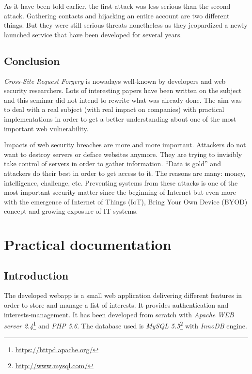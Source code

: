 \documentclass[a4paper,11pt,openany]{report}
\newcommand{\csrf}{\textit{Cross-Site Request Forgery}}
\begin{document}
  As it have been told earlier, the first attack was less serious than the second attack. Gathering contacts and 
  hijacking an entire account are two different things. But they were still serious threats nonetheless as they
  jeopardized a newly launched service that have been developed for several years. 
  
  \section{Conclusion}
  \csrf{} is nowadays well-known by developers and web security researchers. Lots of interesting papers have been written 
  on the subject and this seminar did not intend to rewrite what was already done. The aim was to deal with a real subject 
  (with real impact on companies) with practical implementations in order to get a better understanding about one of the 
  most important web vulnerability.
  
  Impacts of web security breaches are more and more important. Attackers do not want to destroy servers or deface 
  websites anymore. They are trying to invisibly take control of servers in order to gather information. ``Data is gold'' 
  and attackers do their best in order to get access to it. The reasons are many: money, intelligence, challenge, etc. 
  Preventing systems from these attacks is one of the most important security matter since the beginning of Internet but 
  even more with the emergence of Internet of Things (IoT), Bring Your Own Device (BYOD) concept and growing exposure of 
  IT systems.
  
\appendix
{}

\chapter{Practical documentation} \label{app:practical_documentation}

\section{Introduction}
The developed webapp is a small web application delivering different features 
in order to store and manage a list of interests. It provides authentication and 
interests-management. It has been developed from scratch with \textit{Apache 
WEB server 2.4}\footnote{\url{https://httpd.apache.org/}} and \textit{PHP 5.6}. 
The database used is \textit{MySQL 5.5}\footnote{\url{http://www.mysql.com/}} with 
\textit{InnoDB} engine.
\end{document}
